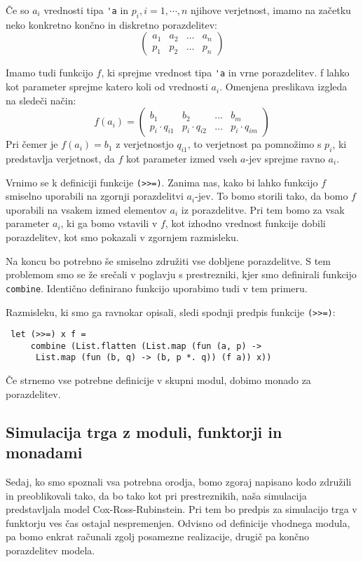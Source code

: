 \documentclass[a4paper,12pt]{article}
\theoremstyle{definition} %
\begin{document}
Če so $a_i$ vrednosti tipa \lstinline{'a} in $p_i, i=1,\cdots,n$ njihove verjetnost, imamo na začetku neko konkretno končno in diskretno porazdelitev:
\[ \left( \begin{array}{cccc}
a_1 & a_2 & \dots & a_n \\
p_1 & p_2 & \dots & p_n  \end{array} \right)\] 

Imamo tudi funkcijo $f$, ki sprejme vrednost tipa \lstinline{'a} in vrne porazdelitev. f lahko kot parameter sprejme katero koli od vrednosti $a_i$. Omenjena preslikava izgleda na sledeči način:
\[ f( a_i) =  \left( \begin{array}{cccc}
b_1 & b_2 & \dots & b_m \\
p_i \cdot q_{i1} & p_i \cdot q_{i2} & \dots & p_i \cdot q_{im} \end{array} \right)\] 
Pri čemer je $f(a_i) = b_1$ z verjetnostjo $q_{i1}$, to verjetnost pa pomnožimo s $p_i$, ki predstavlja verjetnost, da $f$ kot parameter izmed vseh $a$-jev sprejme ravno $a_i$.

Vrnimo se k definiciji funkcije \lstinline{(>>=)}. Zanima nas, kako bi lahko funkcijo $f$ smiselno uporabili na zgornji porazdelitvi $a_i$-jev. To bomo storili tako, da bomo $f$ uporabili na vsakem izmed elementov $a_i$ iz porazdelitve. Pri tem bomo za vsak parameter $a_i$, ki ga bomo vstavili v $f$, kot izhodno vrednost funkcije dobili porazdelitev, kot smo pokazali v zgornjem razmisleku. 

Na koncu bo potrebno še smiselno združiti vse dobljene porazdelitve. S tem problemom smo se že srečali v poglavju s prestrezniki, kjer smo definirali funkcijo \lstinline{combine}. Identično definirano funkcijo uporabimo tudi v tem primeru.

Razmisleku, ki smo ga ravnokar opisali, sledi spodnji predpis funkcije \lstinline{(>>=)}:
 \begin{lstlisting}
 let (>>=) x f =
     combine (List.flatten (List.map (fun (a, p) -> 
      List.map (fun (b, q) -> (b, p *. q)) (f a)) x))
\end{lstlisting}
Če strnemo vse potrebne definicije v skupni modul, dobimo monado za porazdelitev.

\subsection{Simulacija trga z moduli, funktorji in monadami}

Sedaj, ko smo spoznali vsa potrebna orodja, bomo zgoraj napisano kodo združili in preoblikovali tako, da bo tako kot pri prestreznikih, naša simulacija predstavljala model Cox-Ross-Rubinstein. Pri tem bo predpis za simulacijo trga v funktorju ves čas ostajal nespremenjen. Odvisno od definicije vhodnega modula, pa bomo enkrat računali zgolj posamezne realizacije, drugič pa končno porazdelitev modela.
\end{document}
